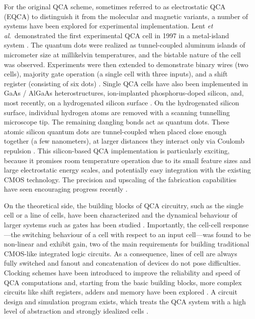 For the original QCA scheme, sometimes referred to as electrostatic QCA (EQCA)
to distinguish it from the molecular and magnetic variants, a number of systems
have been explored for experimental implementation. Lent \emph{et al}.\
demonstrated the first experimental QCA cell in 1997 in a metal-island system
\cite{orlov1997realization}. The quantum dots were realized as tunnel-coupled
aluminum islands of micrometer size at millikelvin temperatures, and the
bistable nature of the cell was observed.  Experiments were then extended to
demonstrate binary wires (two cells), majority gate operation (a single cell
with three inputs), and a shift register (consisting of six dots)
\cite{orlov1999experimental} \cite{amlani1999digital}
\cite{kummamuru2003operation}. Single QCA cells have also been implemented in
GaAs / AlGaAs heterostructures, ion-implanted phosphorus-doped silicon, and,
most recently, on a hydrogenated silicon surface \cite{gardelis2003evidence}
\cite{mitic2006demonstration} \cite{haider2009controlled}. On the hydrogenated
silicon surface, individual hydrogen atoms are removed with a scanning
tunnelling microscope tip. The remaining dangling bonds act as quantum dots.
These atomic silicon quantum dots are tunnel-coupled when placed close enough
together (a few nanometers), at larger distances they interact only via Coulomb
repulsion \cite{pitters2011tunnel}. This silicon-based QCA implementation is
particularly exciting, because it promises room temperature operation due to its
small feature sizes and large electrostatic energy scales, and potentially easy
integration with the existing CMOS technology. The precision and upscaling of
the fabrication capabilities have seen encouraging progress recently
\cite{wolkow2013silicon}.


On the theoretical side, the building blocks of QCA circuitry, such as the
single cell or a line of cells, have been characterized and the dynamical
behaviour of larger systems such as gates has been studied \cite{lent1993lines}
\cite{tougaw1996dynamic}. Importantly, the cell-cell response---the switching
behaviour of a cell with respect to an input cell---was found to be non-linear
and exhibit gain, two of the main requirements for building traditional
CMOS-like integrated logic circuits. As a consequence, lines of cell are always
fully switched and fanout and concatenation of devices do not pose difficulties.
Clocking schemes have been introduced to improve the reliability and speed of
QCA computations and, starting from the basic building blocks, more complex
circuits like shift registers, adders and memory have been explored
\cite{lent1997device} \cite{hennessy2001clocking} \cite{rahimi2008quantum}. A
circuit design and simulation program exists, which treats the QCA system with a
high level of abstraction and strongly idealized cells
\cite{walus2004qcadesigner}.

